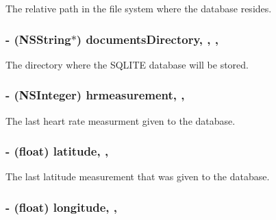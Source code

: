The relative path in the file system where the database resides. \hypertarget{interface_d_b_manager_a2da5077535faad528421bada70121866}{
\subsubsection[{documents\-Directory}]{\setlength{\rightskip}{0pt plus 5cm}-\/ (N\-S\-String$\ast$) documents\-Directory\hspace{0.3cm}{\ttfamily [read]}, {\ttfamily [write]}, {\ttfamily [nonatomic]}, {\ttfamily [strong]}}}\label{interface_d_b_manager_a2da5077535faad528421bada70121866}
The directory where the S\-Q\-L\-I\-T\-E database will be stored. \hypertarget{interface_d_b_manager_ac89481f8c2c45def2b8edb2ba749df68}{
\subsubsection[{hrmeasurement}]{\setlength{\rightskip}{0pt plus 5cm}-\/ (N\-S\-Integer) hrmeasurement\hspace{0.3cm}{\ttfamily [read]}, {\ttfamily [write]}, {\ttfamily [atomic]}}}\label{interface_d_b_manager_ac89481f8c2c45def2b8edb2ba749df68}
The last heart rate measurment given to the database. \hypertarget{interface_d_b_manager_a12dcee066d2cecde8507a6529df92521}{
\subsubsection[{latitude}]{\setlength{\rightskip}{0pt plus 5cm}-\/ (float) latitude\hspace{0.3cm}{\ttfamily [read]}, {\ttfamily [write]}, {\ttfamily [atomic]}}}\label{interface_d_b_manager_a12dcee066d2cecde8507a6529df92521}
The last latitude measurement that was given to the database. \hypertarget{interface_d_b_manager_aa881cd8f0940350240e3ae9a326e5563}{
\subsubsection[{longitude}]{\setlength{\rightskip}{0pt plus 5cm}-\/ (float) longitude\hspace{0.3cm}{\ttfamily [read]}, {\ttfamily [write]}, {\ttfamily [atomic]}}}\label{interface_d_b_manager_aa881cd8f0940350240e3ae9a326e5563}
